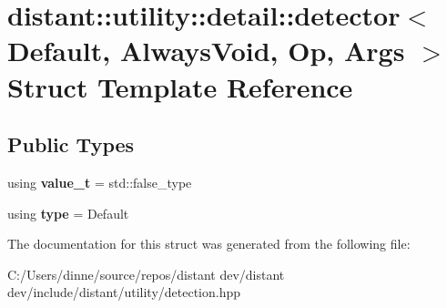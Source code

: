 \hypertarget{structdistant_1_1utility_1_1detail_1_1detector}{}\section{distant\+:\+:utility\+:\+:detail\+:\+:detector$<$ Default, Always\+Void, Op, Args $>$ Struct Template Reference}
\label{structdistant_1_1utility_1_1detail_1_1detector}
\subsection*{Public Types}
\begin{DoxyCompactItemize}
\item 
\mbox{\label{structdistant_1_1utility_1_1detail_1_1detector_a66286f0f6fe1b7c5a8aa2b0300fc3143}} 
using {\bfseries value\+\_\+t} = std\+::false\+\_\+type
\item 
\mbox{\label{structdistant_1_1utility_1_1detail_1_1detector_a1b5495d07d6b5969a68dbfd48c9e5b8e}} 
using {\bfseries type} = Default
\end{DoxyCompactItemize}


The documentation for this struct was generated from the following file\+:\begin{DoxyCompactItemize}
\item 
C\+:/\+Users/dinne/source/repos/distant dev/distant dev/include/distant/utility/detection.\+hpp\end{DoxyCompactItemize}
